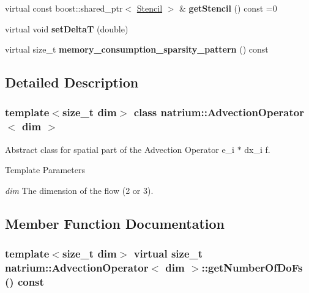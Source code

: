 \begin{DoxyCompactItemize}
\item 
\hypertarget{classnatrium_1_1AdvectionOperator_a76b4ba0077ef23188ca39d8d7081dfee}{
virtual const boost::shared\_\-ptr$<$ \hyperlink{classnatrium_1_1Stencil}{Stencil} $>$ \& {\bfseries getStencil} () const =0}
\label{classnatrium_1_1AdvectionOperator_a76b4ba0077ef23188ca39d8d7081dfee}

\item 
\hypertarget{classnatrium_1_1AdvectionOperator_a6c08044f375da0bb5350d6dc7cce7de6}{
virtual void {\bfseries setDeltaT} (double)}
\label{classnatrium_1_1AdvectionOperator_a6c08044f375da0bb5350d6dc7cce7de6}

\item 
\hypertarget{classnatrium_1_1AdvectionOperator_a37ad28637da38eb776ba3eca89a0820c}{
virtual size\_\-t {\bfseries memory\_\-consumption\_\-sparsity\_\-pattern} () const }
\label{classnatrium_1_1AdvectionOperator_a37ad28637da38eb776ba3eca89a0820c}

\end{DoxyCompactItemize}


\subsection{Detailed Description}
\subsubsection*{template$<$size\_\-t dim$>$ class natrium::AdvectionOperator$<$ dim $>$}

Abstract class for spatial part of the Advection Operator e\_\-i $\ast$ dx\_\-i f. 
\begin{DoxyTemplParams}{Template Parameters}
\item[{\em dim}]The dimension of the flow (2 or 3). \end{DoxyTemplParams}


\subsection{Member Function Documentation}
\hypertarget{classnatrium_1_1AdvectionOperator_a251e21d1dd023926d4c5f7fd973b90bf}{
\subsubsection[{getNumberOfDoFs}]{\setlength{\rightskip}{0pt plus 5cm}template$<$size\_\-t dim$>$ virtual size\_\-t {\bf natrium::AdvectionOperator}$<$ dim $>$::getNumberOfDoFs () const}}
\label{classnatrium_1_1AdvectionOperator_a251e21d1dd023926d4c5f7fd973b90bf}


